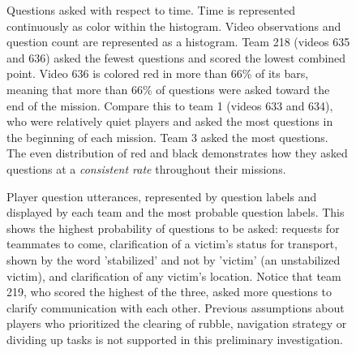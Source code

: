 \begin{figure}[h!]
    \centering
    \caption{Questions asked with respect to time. Time is represented continuously as color within the histogram. Video observations and question count are represented as a histogram. Team 218 (videos 635 and 636) asked the fewest questions and scored the lowest combined point. Video 636 is colored red in more than 66\% of its bars, meaning that more than 66\% of questions were asked toward the end of the mission. Compare this to team 1 (videos 633 and 634), who were relatively quiet players and asked the most questions in the beginning of each mission. Team 3 asked the most questions. The even distribution of red and black demonstrates how they asked questions at a \emph{consistent rate} throughout their missions.}
    \end{figure}
    
\begin{figure}[h!]
    \centering
    \caption{Player question utterances, represented by question labels and displayed by each team and the most probable question labels. This shows the highest probability of questions to be asked: requests for teammates to come, clarification of a victim's status for transport, shown by the word 'stabilized' and not by 'victim' (an unstabilized victim), and clarification of any victim's location. Notice that team 219, who scored the highest of the three, asked more questions to clarify communication with each other. Previous assumptions about players who prioritized the clearing of rubble, navigation strategy or dividing up tasks is not supported in this preliminary investigation.}
\end{figure}


